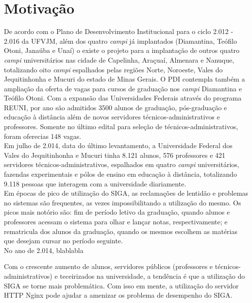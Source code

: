 \section{Motivação}
De acordo com o Plano de Desenvolvimento Institucional para o ciclo 2.012 - 
2.016 da UFVJM, além dos quatro \textit{campi} já implantados (Diamantina, 
Teófilo Otoni, Janaúba e Unaí) o existe o projeto para a implantação de outros 
quatro \textit{campi} universitários nas cidade de Capelinha, Araçuaí, Almenara 
e Nanuque, totalizando oito \textit{campi} espalhados pelas regiões Norte, 
Noroeste, Vales do Jequitinhonha e Mucuri do estado de Minas Gerais. O 
PDI contempla também a ampliação da oferta de vagas para cursos de graduação 
nos \textit{campi} Diamantina e Teófilo Otoni. Com a expansão das Universidades 
Federais através do programa REUNI, por ano são admitidos 3500 alunos de 
graduação, pós-graduação e educação à distância além de novos servidores 
técnicos-administrativos e professores. Somente no último edital para seleção 
de técnicos-administrativos, foram oferecias 148 vagas.\\
Em julho de 2.014, data do último levantamento, a Universidade Federal dos 
Vales do Jequitinhonha e Mucuri tinha 8.121 alunos, 576 professores e 421 
servidores técnicos-administrativos, espalhados em quatro \textit{campi} 
universitários, fazendas experimentais e pólos de ensino em educação à 
distância, totalizando 9.118 pessoas que interagem com a universidade 
diariamente.\\
Em épocas de pico de utilização do SIGA, as reclamações de lentidão e problemas 
no sistemas são frequentes, as vezes impossibilitando a utilização do mesmo. Os 
picos mais notório são: fim de período letivo da graduação, quando alunos e 
professores acessam o sistema para olhar e lançar notas, respectivamente; e 
rematricula dos alunos da graduação, quando os mesmos escolhem as matérias que 
desejam cursar no período seguinte.\\




No ano de 2.014, blablabla






Com o crescente aumento de alunos, servidores públicos (professores e 
técnicos-administrativos) e teceirizados na universidade, a tendência é que a 
utilização do SIGA se torne mais problemática.
Com isso em mente, a utilização do servidor HTTP Nginx pode ajudar a amenizar 
os problema de desempenho do SIGA.\\
